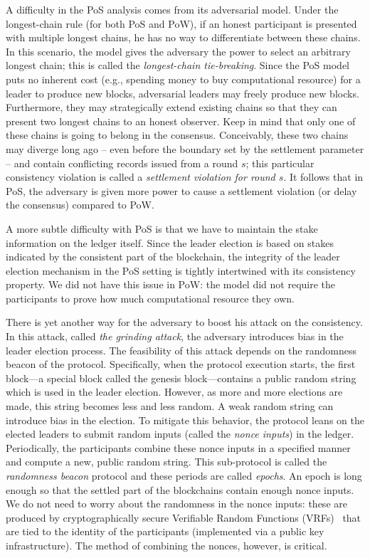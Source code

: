 A difficulty in the PoS analysis 
comes from its adversarial model. 
Under the longest-chain rule (for both PoS and PoW), 
if an honest participant 
is presented with multiple longest chains, 
he has no way to differentiate between these chains. 
In this scenario, the model gives the adversary the power to 
select an arbitrary longest chain; 
this is called the \emph{longest-chain tie-breaking}. 
Since the PoS model puts no inherent cost 
(e.g., spending money to buy computational resource) 
for a leader to produce new blocks, 
adversarial leaders may 
freely produce new blocks. 
Furthermore, they may strategically 
extend existing chains 
so that they can 
present two longest chains to an honest observer. 
Keep in mind that only one of these chains 
is going to belong in the consensus. 
Conceivably, these two chains may diverge 
long ago -- even before the boundary set by the settlement parameter -- and 
contain conflicting records issued from a round $s$; 
this particular consistency violation is called a \emph{settlement violation for round $s$}.  
It follows that in PoS, 
the adversary is given more power to 
cause a settlement violation (or delay the consensus) 
compared to PoW. 


A more subtle difficulty with PoS is that 
we have to maintain the stake information on the ledger itself. 
Since the leader election is based on stakes indicated by the 
consistent part of the blockchain, 
the integrity of the leader election mechanism in the PoS setting 
is tightly intertwined 
with its consistency property. 
We did not have this issue in PoW: 
the model did not require the participants to prove 
how much computational resource they own.

There is yet another way for the adversary to boost his attack on the consistency. 
In this attack, called \emph{the grinding attack}, 
the adversary introduces bias in the leader election process. 
The feasibility of this attack depends on the randomness beacon of the protocol. 
Specifically, when the protocol execution starts, 
the first block---a special block called the genesis block---contains 
a public random string which is used in the leader election. 
However, as more and more elections are made, 
this string becomes less and less random. 
A weak random string can introduce bias in the election. 
To mitigate this behavior, 
the protocol leans on the elected leaders to 
submit random inputs (called the \emph{nonce inputs}) in the ledger. 
Periodically, the participants combine these nonce inputs in a specified manner 
and compute a new, public random string. 
This sub-protocol is called the \emph{randomness beacon} protocol 
and these periods are called \emph{epochs}. 
An epoch is long enough so that the settled part of the blockchains contain enough nonce inputs. 
We do not need to worry about the randomness in the nonce inputs: 
these are produced by cryptographically secure Verifiable Random Functions (VRFs)~\cite{VRF} 
that are tied to the identity of the participants (implemented via a public key infrastructure). 
The method of combining the nonces, however, is critical. 

